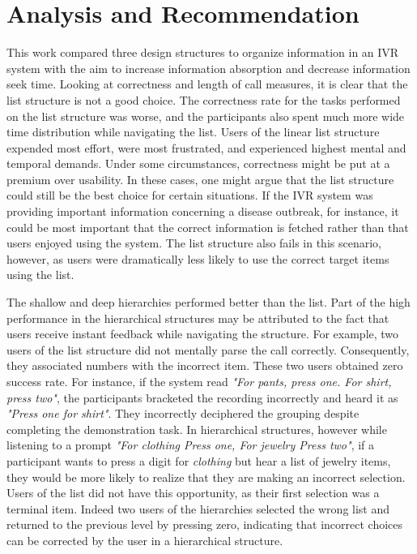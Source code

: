 \documentclass{sigchi}
\begin{document}
\section{Analysis and Recommendation}
This work compared three design structures to organize information in an IVR system with the aim to increase information absorption and decrease information seek time. Looking at correctness and length of call measures, it is clear that the list structure is not a good choice. The correctness rate for the tasks performed on the list structure was worse, and the participants also spent much more wide time distribution while navigating the list. Users of the linear list structure expended most effort, were most frustrated, and experienced highest mental and temporal demands. Under some circumstances, correctness might be put at a premium over usability. In these cases, one might argue that the list structure could still be the best choice for certain situations. If the IVR system was providing important information concerning a disease outbreak, for instance, it could be most important that the correct information is fetched rather than that users enjoyed using the system. The list structure also fails in this scenario, however, as users were dramatically less likely to use the correct target items using the list.

The shallow and deep hierarchies performed better than the list. Part of the high performance in the hierarchical structures may be attributed to the fact that users receive instant feedback while navigating the structure. For example, two users of the list structure did not mentally parse the call correctly. Consequently, they associated numbers with the incorrect item. These two users obtained zero success rate. For instance, if the system read \textit{"For pants, press one. For shirt, press two"}, the participants bracketed the recording incorrectly and heard it as \textit{"Press one for shirt"}. They incorrectly deciphered the grouping despite completing the demonstration task. In hierarchical structures, however while listening to a prompt \textit{"For clothing Press one, For jewelry Press two"}, if a participant wants to press a digit for \textit{clothing} but hear a list of jewelry items, they would be more likely to realize that they are making an incorrect selection. Users of the list did not have this opportunity, as their first selection was a terminal item. Indeed two users of the hierarchies selected the wrong list and returned to the previous level by pressing zero, indicating that incorrect choices can be corrected by the user in a hierarchical structure.
\end{document}
